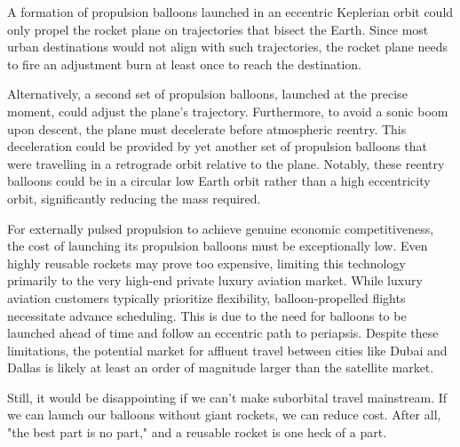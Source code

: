 \documentclass{article}
\begin{document}
A formation of propulsion balloons launched in an eccentric Keplerian orbit could only propel the  rocket plane on trajectories that bisect the Earth. Since most urban destinations would not align with such trajectories, the rocket plane needs to fire an adjustment burn at least once to reach the destination.

Alternatively, a second set of propulsion balloons, launched at the precise moment, could adjust the plane's trajectory. Furthermore, to avoid a sonic boom upon descent, the plane must decelerate before atmospheric reentry. This deceleration could be provided by yet another set of propulsion balloons that were travelling in a retrograde orbit relative to the plane. Notably, these reentry balloons could be in a circular low Earth orbit rather than a high eccentricity orbit, significantly reducing the mass required.

For externally pulsed propulsion to achieve genuine economic competitiveness, the cost of launching its propulsion balloons must be exceptionally low. Even highly reusable rockets may prove too expensive, limiting this technology primarily to the very high-end private luxury aviation market. While luxury aviation customers typically prioritize flexibility, balloon-propelled flights necessitate advance scheduling. This is due to the need for balloons to be launched ahead of time and follow an eccentric path to periapsis. Despite these limitations, the potential market for affluent travel between cities like Dubai and Dallas is likely at least an order of magnitude larger than the satellite market.

Still, it would be disappointing if we can't make suborbital travel mainstream.   If we can launch our balloons without giant rockets, we can reduce cost.   After all, "the best part is no part," \cite{best_part_no_part} and a reusable rocket is one heck of a part.

  
  
\end{document}
